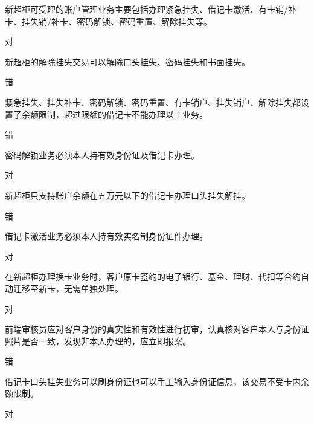 \documentclass[kindlepaper]{BHCexam4kindle}
\begin{document}
\begin{questions}
\qs 新超柜可受理的账户管理业务主要包括办理紧急挂失、借记卡激活、有卡销/补卡、挂失销/补卡、密码解锁、密码重置、解除挂失等。 \xx
\begin{solution} 对 \end{solution}
\qs 新超柜的解除挂失交易可以解除口头挂失、密码挂失和书面挂失。 \xx
\begin{solution} 错 \end{solution}
\qs 紧急挂失、挂失补卡、密码解锁、密码重置、有卡销户、挂失销户、解除挂失都设置了余额限制，超过限额的借记卡不能办理以上业务。 \xx
\begin{solution} 错 \end{solution}
\qs 密码解锁业务必须本人持有效身份证及借记卡办理。 \xx
\begin{solution} 对 \end{solution}
\qs 新超柜只支持账户余额在五万元以下的借记卡办理口头挂失解挂。 \xx
\begin{solution} 错 \end{solution}
\qs 借记卡激活业务必须本人持有效实名制身份证件办理。 \xx
\begin{solution} 对 \end{solution}
\qs 在新超柜办理换卡业务时，客户原卡签约的电子银行、基金、理财、代扣等合约自动迁移至新卡，无需单独处理。 \xx
\begin{solution} 对 \end{solution}
\qs 前端审核员应对客户身份的真实性和有效性进行初审，认真核对客户本人与身份证照片是否一致，发现非本人办理的，应立即报案。 \xx
\begin{solution} 错 \end{solution}
\qs 借记卡口头挂失业务可以刷身份证也可以手工输入身份证信息，该交易不受卡内余额限制。 \xx
\begin{solution} 对 \end{solution}

\end{questions}
\end{document}
